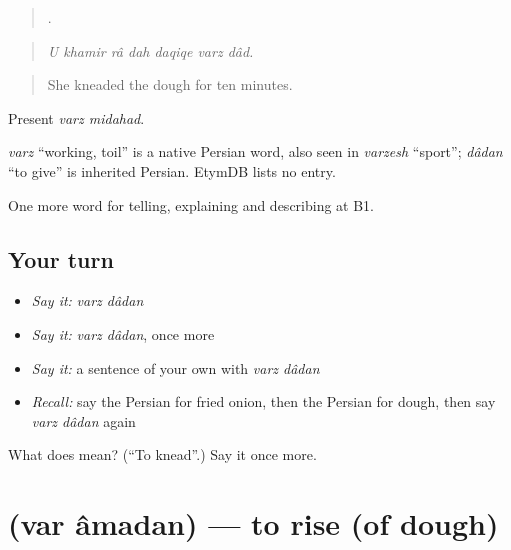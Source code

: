 \begin{quote}
      .
\end{quote}

\begin{quote}
\emph{U khamir râ dah daqiqe varz dâd.}
\end{quote}

\begin{quote}
She kneaded the dough for ten minutes.
\end{quote}

Present \emph{varz midahad}.

\begin{cousinweb}
\emph{varz} \textquotedblleft{}working, toil\textquotedblright{} is a native Persian word, also seen in \emph{varzesh} \textquotedblleft{}sport\textquotedblright{}; \emph{dâdan} \textquotedblleft{}to give\textquotedblright{} is inherited Persian. EtymDB lists no entry.
\end{cousinweb}

\begin{grammarlens}[title={What you've built}]
One more word for telling, explaining and describing at B1.
\end{grammarlens}

\subsection*{Your turn}
\begin{itemize}
\raggedright
  \item \emph{Say it:} \emph{varz dâdan}
  \item \emph{Say it:} \emph{varz dâdan}, once more
  \item \emph{Say it:} a sentence of your own with \emph{varz dâdan}
  \item \emph{Recall:} say the Persian for fried onion, then the Persian for dough, then say \emph{varz dâdan} again
\end{itemize}

\begin{tcolorbox}[breakable,colback=teal!4,colframe=teal!35!black,title={Before you move on}]
What does   mean? (\textquotedblleft{}To knead\textquotedblright{}.) Say it once more.
\end{tcolorbox}
\section[\texorpdfstring{\fa{ور} \fa{آمدن} (var âmadan)}{ور آمدن (var âmadan)}]{  (var âmadan) — to rise (of dough)}

